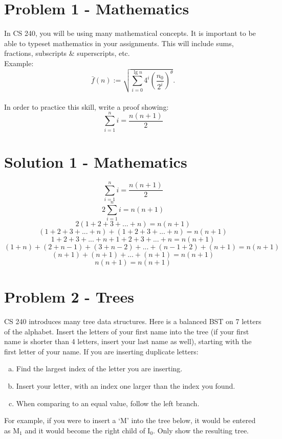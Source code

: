 \documentclass[12pt]{article}
\begin{document}

\section*{Problem 1 - Mathematics}
In CS 240, you will be using many mathematical concepts. It is important to be able to typeset mathematics in your assignments. This will include sums, fractions, subscripts \& superscripts, etc. \\
Example: 
$$\bar{f}(n) := \sqrt {\sum_{i=0}^{\lg n} 4^i \left ( \frac{n_0}{2^i} \right )^{\theta}}.$$
\\
In order to practice this skill, write a proof showing: $$\sum_{i=1}^n i = \frac {n(n+1)} {2}$$
\clearpage
\section*{Solution 1 - Mathematics}
$$\sum_{i=1}^n i = \frac {n(n+1)} {2}$$
$$2\sum_{i=1}^n i = n(n+1) $$
$$2(1 + 2 + 3 + ... + n) = n(n+1)$$
$$(1 + 2 + 3 + ... + n) + (1 + 2 + 3 + ... + n) = n(n+1)$$
$$1 + 2 + 3 + ... + n + 1 + 2 + 3 + ... + n = n(n+1)$$
$$(1 + n) + (2 + n-1) + (3 + n-2) + ... + (n-1 + 2) + (n + 1) = n(n+1)$$
$$(n+1) + (n+1) + ... + (n+1) = n(n+1) $$
$$n(n+1) = n(n+1)$$

\clearpage
\section*{Problem 2 - Trees}
CS 240 introduces many tree data structures. Here is a balanced BST on 7 letters of the
 alphabet. Insert the letters of your first name into the tree (if your first name is 
shorter than 4 letters, insert your last name as well), starting 
with the first letter of your name. If you are inserting duplicate
letters:


\begin{enumerate}[a)]
	\item Find the largest index of the letter you are inserting. 
	\item Insert your letter, with an index one larger than the index you found.
	\item When comparing to an equal value, follow the left branch.

\end{enumerate}

For example, if you were to insert a `M' into the tree below, it would be entered as M$_1$ and it would become the right child of I$_0$. Only show the resulting tree.
\end{document}
